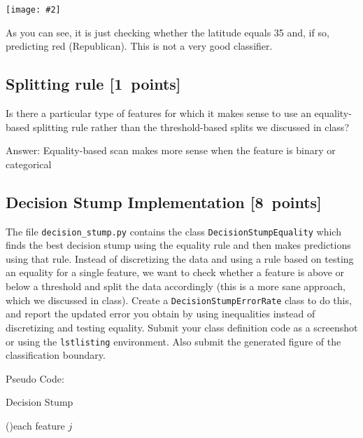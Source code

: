 \documentclass{article}
\newcommand{\blu}[1]{{\textcolor{blu}{#1}}}
\newcommand{\gre}[1]{\textcolor{gre}{#1}}
\newcommand\ans[1]{\par\gre{Answer: #1}}
\let\ask\blu
\newcommand\pts[1]{\textcolor{pointscolour}{[#1~points]}}
\newcommand{\centerfig}[2]{\begin{center}\texttt{[image: \#2]}\end{center}}
\begin{document}
  \centerfig{0.7}{./figs/q6_decisionBoundary}

  As you can see, it is just checking whether the latitude equals 35 and, if so, predicting red (Republican).
  This is not a very good classifier.

  \subsection{Splitting rule \pts{1}}

  Is there a particular type of features for which it makes sense to use an equality-based splitting rule rather than the threshold-based splits we discussed in class?

  \ans{Equality-based scan makes more sense when the feature is binary or categorical }

  \subsection{Decision Stump Implementation \pts{8}}

  The file \texttt{decision\string_stump.py} contains the class \texttt{DecisionStumpEquality} which
  finds the best decision stump using the equality rule and then makes predictions using that
  rule. Instead of discretizing the data and using a rule based on testing an equality for
  a single feature, we want to check whether a feature is above or below a threshold and
  split the data accordingly (this is a more sane approach, which we discussed in class).
  \ask{Create a \texttt{DecisionStumpErrorRate} class to do this, and report the updated error you
  obtain by using inequalities instead of discretizing and testing equality.
  Submit your class definition code as a screenshot or using the \texttt{lstlisting} environment.
  Also submit the generated figure of the classification boundary.}

  Pseudo Code:

  \begin{algorithm}[hbt!]
  \caption{Decision Stump}\label{alg:one}    

  \For(){each feature $j$}{
    
}

  \end{algorithm}
\end{document}
